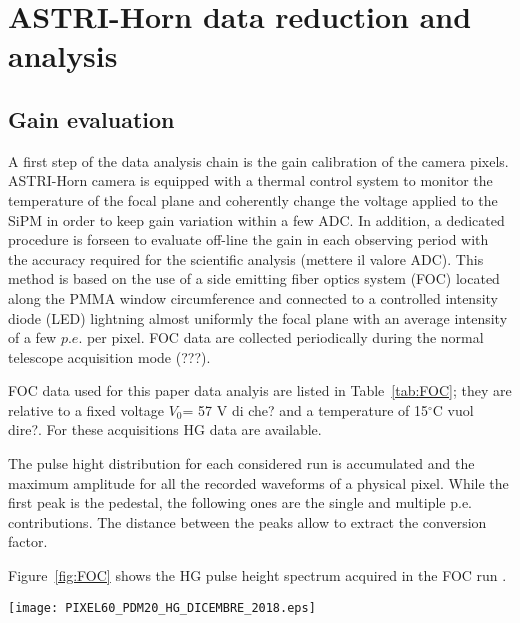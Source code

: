 \section{ASTRI-Horn data reduction and analysis} 
\label{sect:astridata}

\subsection{Gain evaluation}
\label{subs:gain}

A first step of the data analysis chain is the gain calibration of the camera pixels. 
ASTRI-Horn camera is equipped with a thermal control system to monitor the temperature of the focal plane and coherently change the voltage applied to the SiPM in order to keep gain variation within a few ADC. In addition, a dedicated procedure is forseen to evaluate off-line the gain in each observing period with the accuracy required for the scientific analysis ({\tem mettere il valore} ADC). This method is based on the use of a side emitting fiber optics system (FOC) located along the PMMA window circumference and connected to a controlled intensity diode (LED) lightning  almost uniformly  the focal plane with an average intensity of a few $p.e.$ per pixel. FOC data are collected periodically during the normal telescope acquisition mode (???).

FOC data used for this paper data analyis are listed in Table~\ref{tab:FOC}; they are relative to a fixed voltage $V_{0}$= 57 V {\tem di che?} and a temperature of 15$^\circ$C {\che vuol dire?}. For these acquisitions HG data are available.

The pulse hight distribution for each considered run is accumulated and the  maximum amplitude 
for all the recorded waveforms of a physical pixel. While the first peak is the pedestal, the following  ones are the single and multiple p.e. contributions. The distance between 
the peaks allow to extract the conversion factor.

Figure~\ref{fig:FOC} shows the HG pulse height spectrum acquired in the FOC run . 


\begin{figure*}[ht!!]
\centering
\texttt{[image: PIXEL60\_PDM20\_HG\_DICEMBRE\_2018.eps]}
\vspace{0.5cm}
\caption{ Pulse height spectrum at a fixed temperature of 15$^\circ$C
and $V_{0}$=57 V for a camera pixel, during a FOC run in the HG electronics chain. 
The black curve represents the distribution of the peak detector output and the red curve shows the corresponding
multiple peaks Gaussian fit.}
\label{fig:FOC}
\end{figure*}


